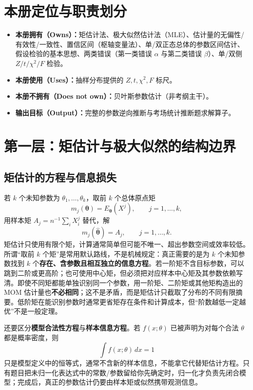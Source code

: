 \documentclass[11pt,a4paper]{ctexart}
\newcommand{\kw}[1]{\textbf{\color{deep}#1}}
\begin{document}
\section{本册定位与职责划分}

\begin{itemize}
  \item \kw{本册拥有（Owns）：}矩估计法、极大似然估计法（MLE）、估计量的无偏性/有效性/一致性、置信区间（枢轴变量法）、单/双正态总体的参数区间估计、假设检验的基本思想、两类错误（第一类错误 $\alpha$ 与第二类错误 $\beta$）、单/双侧 $Z/t/\chi^2/F$ 检验。
  \item \kw{本册使用（Uses）：}抽样分布提供的 $Z, t, \chi^2, F$ 标尺。
  \item \kw{本册不拥有（Does not own）：}贝叶斯参数估计（非考纲主干）。
  \item \kw{输出目标（Output）：}完整的参数逆向推断与考场统计推断题求解算子。
\end{itemize}

\section{第一层：矩估计与极大似然的结构边界}

\subsection{矩估计的方程与信息损失}

若 $k$ 个未知参数为 $\theta_1,\ldots,\theta_k$，取前 $k$ 个总体原点矩
\[
m_j(\boldsymbol\theta)=E_{\boldsymbol\theta}(X^j),\qquad j=1,\ldots,k,
\]
用样本矩 $A_j=n^{-1}\sum_iX_i^j$ 替代，解
\[
m_j(\widehat{\boldsymbol\theta})=A_j,\qquad j=1,\ldots,k.
\]
矩估计只使用有限个矩，计算通常简单但可能不唯一、超出参数空间或效率较低。所谓“取前 $k$ 个矩”是常用默认路线，不是机械规定：真正需要的是为 $k$ 个未知参数找到 $k$ 个\kw{存在、含参数且相互独立的信息方程}。若一阶矩不含目标参数，可以跳到二阶或更高阶；也可使用中心矩，但必须把对应样本中心矩及其参数依赖写清。即使不同矩都能单独识别同一个参数，用一阶矩、二阶矩或其他矩构造出的 MOM 估计量也\kw{不必相同}；这不是矛盾，而是矩估计只截取了分布的不同有限摘要。低阶矩在能识别参数时通常更省矩存在条件和计算成本，但“阶数越低一定越优”不是一般定理。

还要区分\kw{模型合法性方程}与\kw{样本信息方程}。若 $f(x;\theta)$ 已被声明为对每个合法 $\theta$ 都是概率密度，则
\[
\int f(x;\theta)\,dx=1
\]
只是模型定义中的恒等式，通常不含新的样本信息，不能拿它代替矩估计方程。只有题目把未归一化表达式中的常数/参数留给你先确定时，归一化才负责先闭合模型；完成后，真正的参数估计仍要由样本矩或似然携带观测信息。
\end{document}
